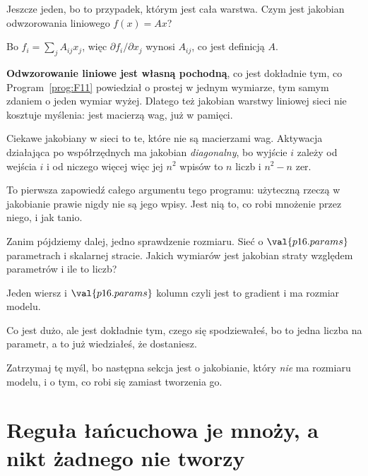 \begin{fr}
Jeszcze jeden, bo to przypadek, którym jest cała warstwa. Czym jest jakobian
odwzorowania liniowego $f(x) = Ax$?
\dotline
\nextframe
\end{fr}

\begin{fr}
Bo $f_i = \sum_j A_{ij} x_j$, więc $\partial f_i / \partial x_j$ wynosi
$A_{ij}$, co jest definicją $A$.

\textbf{Odwzorowanie liniowe jest własną pochodną}, co jest dokładnie tym, co
Program~\ref{prog:F11} powiedział o prostej w jednym wymiarze, tym samym
zdaniem o jeden wymiar wyżej. Dlatego też jakobian warstwy liniowej sieci nie
kosztuje myślenia: jest macierzą wag, już w pamięci.

\begin{aibox}
Ciekawe jakobiany w sieci to te, które nie są macierzami wag. Aktywacja
działająca po współrzędnych ma jakobian \emph{diagonalny}, bo wyjście $i$
zależy od wejścia $i$ i od niczego więcej \dash{} więc jej $n^{2}$ wpisów to
$n$ liczb i $n^{2} - n$ zer.

To pierwsza zapowiedź całego argumentu tego programu: użyteczną rzeczą w
jakobianie prawie nigdy nie są jego wpisy. Jest nią to, co robi mnożenie przez
niego, i jak tanio.
\end{aibox}
\end{fr}

\begin{fr}
Zanim pójdziemy dalej, jedno sprawdzenie rozmiaru. Sieć o
$\val{p16.params}$ parametrach i skalarnej stracie. Jakich wymiarów jest
jakobian straty względem parametrów i ile to liczb?
\nextframe
\end{fr}

\begin{fr}
\begin{ansblock}
Jeden wiersz i $\val{p16.params}$ kolumn \dash{} czyli jest to gradient i ma
rozmiar modelu.
\end{ansblock}

Co jest dużo, ale jest dokładnie tym, czego się spodziewałeś, bo to jedna
liczba na parametr, a to już wiedziałeś, że dostaniesz.

Zatrzymaj tę myśl, bo następna sekcja jest o jakobianie, który \emph{nie} ma
rozmiaru modelu, i o tym, co robi się zamiast tworzenia go.
\end{fr}

\section{Reguła łańcuchowa je mnoży, a nikt żadnego nie tworzy}
\label{sec:P16-chain}

